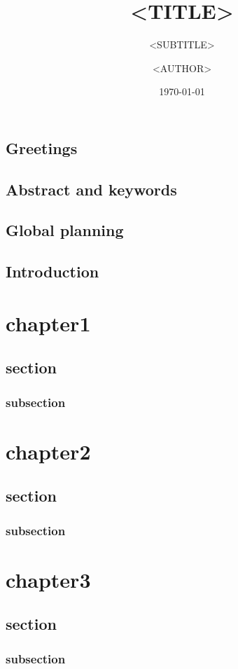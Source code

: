 \documentclass{report} %
\author{<AUTHOR>}
\date{\noexpand\today} %
\title{<TITLE>}
\subtitle{<SUBTITLE>}
\begin{document}
\imtneMaketitlepage

\tableofcontents

\newpage

\section{Greetings}

\section{Abstract and keywords}

\section{Global planning}

\newpage


\section{Introduction}


\chapter{chapter1}

\section{section}

\subsection{subsection}

\chapter{chapter2}

\section{section}

\subsection{subsection}

\chapter{chapter3}

\section{section}

\subsection{subsection}

\imtneMakeCover
\end{document}
